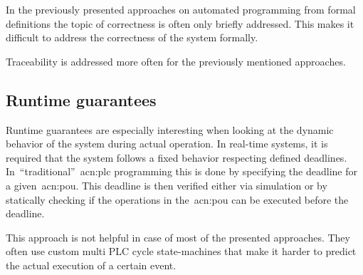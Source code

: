 In the previously presented approaches on automated programming from formal definitions the topic of correctness is often only briefly addressed.
This makes it difficult to address the correctness of the system formally.

Traceability is addressed more often for the previously mentioned approaches.

\subsection{Runtime guarantees}
\label{sec:sub:rt}
Runtime guarantees are especially interesting when looking at the dynamic behavior of the system during actual operation.
In real-time systems, it is required that the system follows a fixed behavior respecting defined deadlines.
In~\enquote{traditional}~\acrshort{acn:plc} programming this is done by specifying the deadline for a given~\acrfull{acn:pou}.
This deadline is then verified either via simulation or by statically checking if the operations in the~\acrshort{acn:pou} can be executed before the deadline.

This approach is not helpful in case of most of the presented approaches.
They often use custom multi PLC cycle state-machines that make it harder to predict the actual execution of a certain event.

